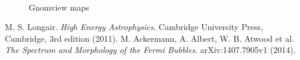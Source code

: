 \documentclass[a4paper]{article}
\begin{document}
\begin{figure}[h]
{\begin{subfigure}[b]{.5\textwidth}
	\end{subfigure}%
	}\\
\caption{Gnomview maps}
\label{Fit_IC_pi0_to_ROI}
\end{figure}





\begin{thebibliography}{9}
	 M. S. Longair. \textit{High Energy Astrophysics}. Cambridge University Press, Cambridge, 3rd edition (2011).
	 M. Ackermann, A. Albert, W. B. Atwood et al. \textit{The Spectrum and Morphology of the \textit{Fermi} Bubbles}. arXiv:1407.7905v1 (2014).\\
\end{thebibliography}
\end{document}

